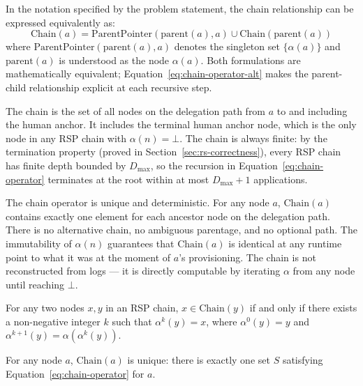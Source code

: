 In the notation specified by the problem statement, the chain relationship can be expressed equivalently as:
\begin{equation}
\mathrm{Chain}(a) = \mathrm{ParentPointer}(\mathrm{parent}(a), a) \cup \mathrm{Chain}(\mathrm{parent}(a))
\label{eq:chain-operator-alt}
\end{equation}
where $\mathrm{ParentPointer}(\mathrm{parent}(a), a)$ denotes the singleton set $\{\alpha(a)\}$ and $\mathrm{parent}(a)$ is understood as the node $\alpha(a)$. Both formulations are mathematically equivalent; Equation~\ref{eq:chain-operator-alt} makes the parent-child relationship explicit at each recursive step.

The chain is the set of all nodes on the delegation path from $a$ to and including the human anchor. It includes the terminal human anchor node, which is the only node in any RSP chain with $\alpha(n) = \bot$. The chain is always finite: by the termination property (proved in Section~\ref{sec:rs-correctness}), every RSP chain has finite depth bounded by $D_{\max}$, so the recursion in Equation~\ref{eq:chain-operator} terminates at the root within at most $D_{\max} + 1$ applications.

The chain operator is unique and deterministic. For any node $a$, $\mathrm{Chain}(a)$ contains exactly one element for each ancestor node on the delegation path. There is no alternative chain, no ambiguous parentage, and no optional path. The immutability of $\alpha(n)$ guarantees that $\mathrm{Chain}(a)$ is identical at any runtime point to what it was at the moment of $a$'s provisioning. The chain is not reconstructed from logs --- it is directly computable by iterating $\alpha$ from any node until reaching $\bot$.

\begin{prop}
\label{prop:chain-membership}
For any two nodes $x, y$ in an RSP chain, $x \in \mathrm{Chain}(y)$ if and only if there exists a non-negative integer $k$ such that $\alpha^{k}(y) = x$, where $\alpha^{0}(y) = y$ and $\alpha^{k+1}(y) = \alpha(\alpha^{k}(y))$.
\end{prop}

\begin{prop}
\label{prop:chain-uniqueness}
For any node $a$, $\mathrm{Chain}(a)$ is unique: there is exactly one set $S$ satisfying Equation~\ref{eq:chain-operator} for $a$.
\end{prop}

